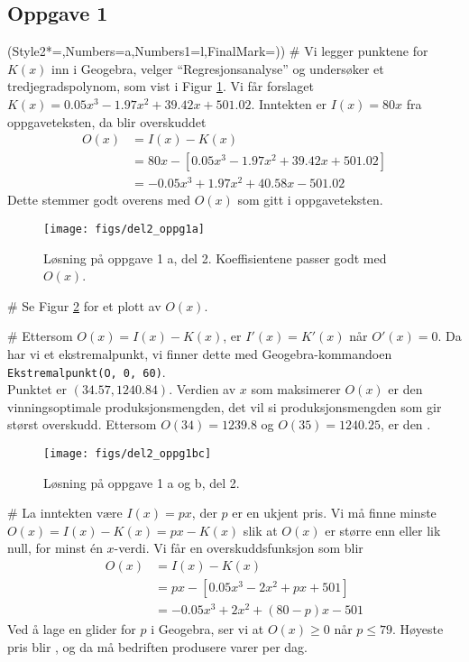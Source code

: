 \subsection*{Oppgave 1}
\begin{easylist}[enumerate]
	\ListProperties(Style2*=,Numbers=a,Numbers1=l,FinalMark={)})
	# Vi legger punktene for $K(x)$ inn i Geogebra, velger ``Regresjonsanalyse'' og undersøker et tredjegradspolynom, som vist i Figur \ref{fig:del2_oppg1a}.
	Vi får forslaget $K(x) = 0.05x^3 - 1.97x^2 + 39.42x + 501.02$.
	Inntekten er $I(x) = 80x$ fra oppgaveteksten, da blir overskuddet
	\begin{align*}
		O(x) &= I(x) - K(x) \\
		&= 80x -\left[ 0.05x^3 - 1.97x^2 + 39.42x + 501.02 \right] \\
		&= - 0.05x^3 + 1.97x^2 + 40.58x - 501.02
	\end{align*}
	Dette stemmer godt overens med $O(x)$ som gitt i oppgaveteksten.
	\begin{figure}[ht!]
		\centering
		\texttt{[image: figs/del2\_oppg1a]}
		\caption{Løsning på oppgave 1 a, del 2. Koeffisientene passer godt med $O(x)$.}
		\label{fig:del2_oppg1a}
	\end{figure}
	# Se Figur \ref{fig:del2_oppg1bc} for et plott av $O(x)$.
	
	# Ettersom $O(x) = I(x) - K(x)$, er $I'(x) = K'(x)$ når $O'(x) = 0$.
	Da har vi et ekstremalpunkt, vi finner dette med Geogebra-kommandoen\\
	\verb|Ekstremalpunkt(O, 0, 60)|. \\
	Punktet er $(34.57, 1240.84)$.
	Verdien av $x$ som maksimerer $O(x)$ er den vinningsoptimale produksjonsmengden, det vil si produksjonsmengden som gir størst overskudd.
	Ettersom $O(34) = 1239.8$ og $O(35)=1240.25$, er den .
	
	\begin{figure}[ht!]
		\centering
		\texttt{[image: figs/del2\_oppg1bc]}
		\caption{Løsning på oppgave 1 a og b, del 2. }
		\label{fig:del2_oppg1bc}
	\end{figure}
	# La inntekten være $I(x) = px$, der $p$ er en ukjent pris.
	Vi må finne minste $O(x) = I(x) - K(x) = px - K(x)$ slik at $O(x)$ er større enn eller lik null, for minst én $x$-verdi.
	Vi får en overskuddsfunksjon som blir
	\begin{align*}
		O(x) &= I(x) - K(x) \\
		&= px -\left[ 0.05x^3 - 2x^2 + px + 501 \right] \\
		&= - 0.05x^3 + 2x^2 + (80 - p)x - 501
	\end{align*}
	Ved å lage en glider for $p$ i Geogebra, ser vi at $O(x) \geq 0$ når $p \leq 79$. Høyeste pris blir , og da må bedriften produsere  varer per dag.
\end{easylist}


